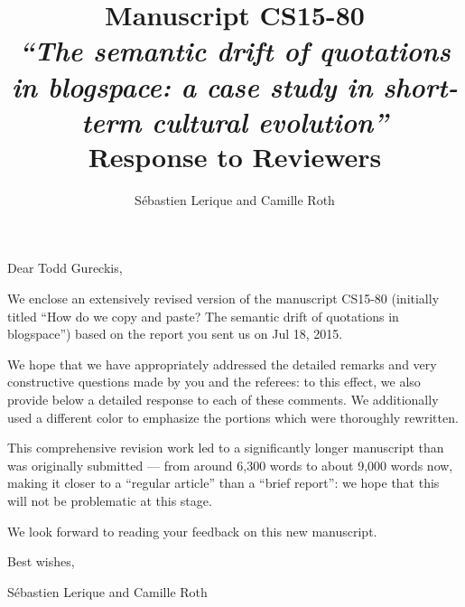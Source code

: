 \documentclass[a4paper,10pt]{article}
\title{Manuscript CS15-80\medskip\\
{\Large\em``The semantic drift of quotations in blogspace: a case study in short-term cultural evolution''}
\bigskip\\Response to Reviewers
}
\author{Sébastien Lerique and Camille Roth}
\begin{document}
\maketitle

\makeatletter
\renewcommand{\subsection}{\clearpage\@startsection{section}{1}{0mm}
{\baselineskip}{\baselineskip\medskip\hrule\medskip}{\raggedright\Large\bf~\textcolor{MidnightBlue}}}
\makeatother


\newcommand{\critique}[1]{\begin{quote}#1\end{quote}}
\newcommand{\answer}[1]{{\setlength{\parindent}{0pt}\par\color{MidnightBlue} #1}}

\vspace{3cm}
Dear Todd Gureckis,

\medskip
We enclose an extensively revised version of the manuscript CS15-80 (initially titled ``How do we copy and paste? The semantic drift of quotations in blogspace'') based on the report you sent us on Jul 18, 2015.

\medskip
We hope that we have appropriately addressed the detailed remarks and very constructive questions made by you and the referees: to this effect, we also provide below a detailed response to each of these comments.  We additionally used a different color to emphasize the portions which were thoroughly rewritten.

\medskip
This comprehensive revision work led to a significantly longer manuscript than was originally submitted --- from around 6,300 words to about 9,000 words now, making it closer to a ``regular article'' than a ``brief report'': we hope that this will not be problematic at this stage.

\medskip
We look forward to reading your feedback on this new manuscript.

\medskip
Best wishes,

\medskip
Sébastien Lerique and Camille Roth
\end{document}
